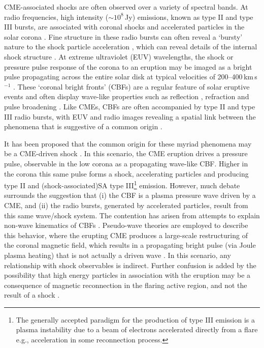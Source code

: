 

CME-associated shocks are often observed over a variety of spectral bands. At radio frequencies, high intensity ($\sim$$10^8$\,Jy) emissions, known as type II and type III bursts, are associated with coronal shocks and accelerated particles in the solar corona \citep{wild1950, mann1996}. Fine structure in these radio bursts can often reveal a \textquoteleft bursty' nature to the shock particle acceleration \citep{mann2005}, which can reveal details of the internal shock structure \citep{zlobec1993, guo2010}.
At extreme ultraviolet (EUV) wavelengths, the shock or pressure pulse response of the corona to an eruption may be imaged as a bright pulse propagating across the entire solar disk at typical velocities of 200--400\,km\,s$^{-1}$ \citep{gallagher2011}. These \textquoteleft coronal bright fronts' (CBFs) are a regular feature of solar eruptive events and often display wave-like properties such as reflection \citep{gopal2009}, refraction \citep{wang2000} and pulse broadening \citep{long2011}. %
Like CMEs, CBFs are often accompanied by type II and type III radio bursts, with EUV and radio images revealing a spatial link between the phenomena that is suggestive of a common origin \citep{maia2004, kozarev2011, vrsna2005}.


It has been proposed that the common origin for these myriad phenomena may be a CME-driven shock \citep{grechnev2011, warmuth2004b}.  In this scenario, the CME eruption drives a pressure pulse, observable in the low corona as a propagating wave-like CBF. Higher in the corona this same pulse forms a shock, accelerating particles and producing type II and (shock-associated)SA type III\footnote{The generally accepted paradigm for the production of type III emission is a plasma instability due to a beam of electrons accelerated directly from a flare e.g., acceleration in some reconnection process.} emission. However, much debate surrounds the suggestion that (i) the CBF is a plasma pressure wave driven by a CME, and (ii) the radio bursts, generated by accelerated particles, result from this same wave/shock system. The contention has arisen from attempts to explain non-wave kinematics of CBFs \citep{zhukov2009}. Pseudo-wave theories are employed to describe this behavior, where the erupting CME produces a large-scale restructuring of the coronal magnetic field, which results in a propagating bright pulse (via Joule plasma heating) that is not actually a driven wave \citep{delannee2008}. In this scenario, any relationship with shock observables is indirect. Further confusion is added by the possibility that high energy particles in association with the eruption may be a consequence of magnetic reconnection in the flaring active region, and not the result of a shock \citep{kahler2007}.

